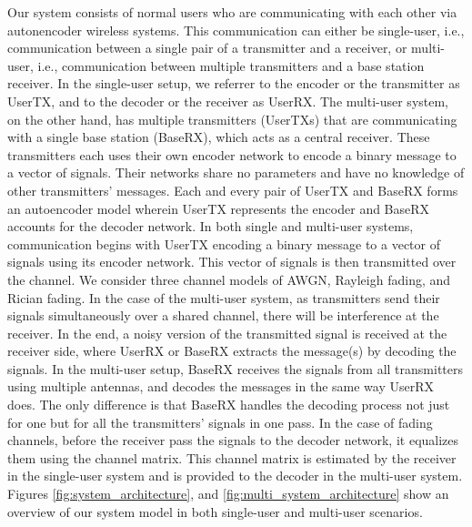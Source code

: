 Our system consists of normal users who are communicating with each other via autonencoder wireless systems. This communication can either be single-user, i.e., communication between a single pair of a transmitter and a receiver, or multi-user, i.e., communication between multiple transmitters and a base station receiver. In the single-user setup, we referrer to the encoder or the transmitter as UserTX, and to the decoder or the receiver as UserRX. The multi-user system, on the other hand, has multiple transmitters (UserTXs) that are communicating with a single base station (BaseRX), which acts as a central receiver. These transmitters each uses their own encoder network to encode a binary message to a vector of signals. Their networks share no parameters and have no knowledge of other transmitters' messages. Each and every pair of UserTX and BaseRX forms an autoencoder model wherein UserTX represents the encoder and BaseRX accounts for the decoder network. In both single and multi-user systems, communication begins with UserTX encoding a binary message to a vector of signals using its encoder network. This vector of signals is then transmitted over the channel. We consider three channel models of AWGN, Rayleigh fading, and Rician fading. In the case of the multi-user system, as transmitters send their signals simultaneously over a shared channel, there will be interference at the receiver. In the end, a noisy version of the transmitted signal is received at the receiver side, where UserRX or BaseRX extracts the message(s) by decoding the signals. In the multi-user setup, BaseRX receives the signals from all transmitters using multiple antennas, and decodes the messages in the same way UserRX does. The only difference is that BaseRX handles the decoding process not just for one but for all the transmitters' signals in one pass. In the case of fading channels, before the receiver pass the signals to the decoder network, it equalizes them using the channel matrix. This channel matrix is estimated by the receiver in the single-user system and is provided to the decoder in the multi-user system. Figures \ref{fig:system_architecture}, and \ref{fig:multi_system_architecture} show an overview of our system model in both single-user and multi-user scenarios.

